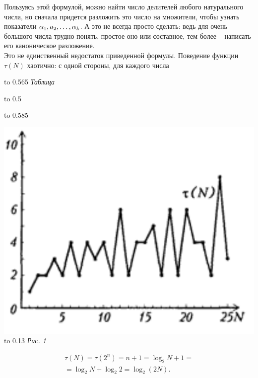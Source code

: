 \begin{multicols}{3}
		Пользуясь этой формулой, можно найти число делителей любого натурального числа, но сначала придется разложить это число на множители, чтобы узнать показатели $\alpha_1, a_2, \ldots, \alpha_k$. А это не всегда просто сделать: ведь для очень большого числа трудно понять, простое оно или составное, тем более -- написать его каноническое разложение.\\
		
		Это не единственный недостаток приведенной формулы. Поведение функции $\tau(N)$ хаотично: с одной стороны, для каждого числа
		
		\rule{0pt}{2.7em}
		
		\hbox to 0.565\textwidth
			{\hfil \textsl{Таблица}\hfil}
		
		

	\end{multicols}

	\noindent
	\hbox to 0.5\textwidth {\small $4^*$\hss 15}

	
	\newpage
	
	\hbox to 0.585
	\begin{multicols*}{3}
		\rule{0pt}{0.6 \textheight}
		\includegraphics[width=\columnwidth]{pict}
		\hbox to 0.13\textwidth
		{\hfil \textsl{Рис. 1}\hfil}
	
		\columnbreak
		\rule{0pt}{0.2 \textheight}
		
		{\footnotesize
		\begin{multline*}
			\tau(N) = \tau(2^n) = n + 1 = \log_2 N + 1 =\\
			= \log_2 N + \log_2 2 = \log_2 {(2N)}.
		\end{multline*}
		}
	
	\end{multicols*}

